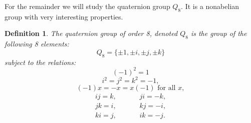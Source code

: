 \documentclass[11pt]{article}
\newtheorem{definition}{Definition}
\begin{document}
For the remainder we will study the quaternion group $Q_8$.  It is a nonabelian group with very interesting properties.
\begin{definition}
  The \textit{quaternion group of order 8}, denoted $Q_8$ is the group of the following 8 elements:
  \[Q_8 = \{\pm1,\pm i, \pm j, \pm k\}\]
  subject to the relations:
  \[(-1)^2 = 1\]
  \[i^2 = j^2 = k^2 = -1,\]
  \[(-1)x = -x = x(-1)\text{ for all }x,\]
  \begin{eqnarray*}
    ij = k, & \hspace{20pt} & ji = -k,\\
    jk = i, & \hspace{20pt} & kj = -i,\\
    ki = j, & \hspace{20pt} & ik = -j.
  \end{eqnarray*}
\end{definition}
\end{document}
